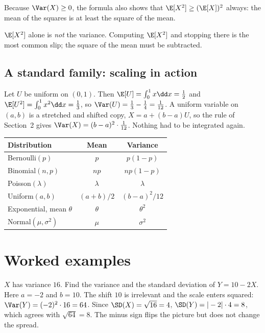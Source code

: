 Because $\Var(X)\ge0$, the formula also shows that $\E[X^2]\ge(\E[X])^2$ always: the mean of the squares is at least the square of the mean.

\begin{commonmistake}
$\E[X^2]$ alone is \emph{not} the variance. Computing $\E[X^2]$ and stopping there is the most common slip; the square of the mean must be subtracted.
\end{commonmistake}

\subsection{A standard family: scaling in action}

Let $U$ be uniform on $(0,1)$. Then $\E[U]=\int_0^1 x\dd x=\tfrac12$ and $\E[U^2]=\int_0^1 x^2\dd x=\tfrac13$, so $\Var(U)=\tfrac13-\tfrac14=\tfrac1{12}$.
A uniform variable on $(a,b)$ is a stretched and shifted copy, $X=a+(b-a)U$, so the rule of Section~2 gives $\Var(X)=(b-a)^2\cdot\tfrac1{12}$. Nothing had to be
integrated again.

\begin{center}
\begin{tabular}{@{}lcc@{}}
\toprule
Distribution & Mean & Variance\\
\midrule
Bernoulli$(p)$ & $p$ & $p(1-p)$\\
Binomial$(n,p)$ & $np$ & $np(1-p)$\\
Poisson$(\lambda)$ & $\lambda$ & $\lambda$\\
Uniform$(a,b)$ & $(a+b)/2$ & $(b-a)^2/12$\\
Exponential, mean $\theta$ & $\theta$ & $\theta^2$\\
Normal$(\mu,\sigma^2)$ & $\mu$ & $\sigma^2$\\
\bottomrule
\end{tabular}
\end{center}

\section{Worked examples}

\begin{workedexample}
$X$ has variance $16$. Find the variance and the standard deviation of $Y=10-2X$.
\solution Here $a=-2$ and $b=10$. The shift $10$ is irrelevant and the scale enters squared:
$\Var(Y)=(-2)^2\cdot16=64$. Since $\SD(X)=\sqrt{16}=4$, $\SD(Y)=|-2|\cdot4=8$, which agrees with $\sqrt{64}=8$. The minus sign flips the picture but does not
change the spread.
\end{workedexample}

